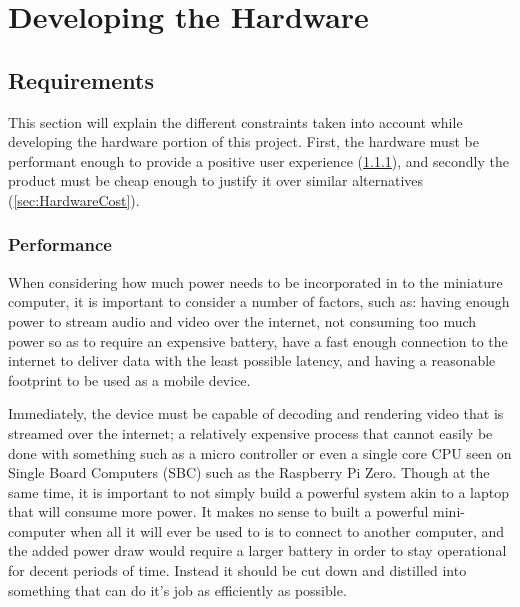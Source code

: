 \chapter{Developing the Hardware} %

\label{Chapter4} %


\section{Requirements}\label{sec:HardwareRequirements}

This section will explain the different constraints taken into account while developing the hardware portion of this project.
First, the hardware must be performant enough to provide a positive user experience (\ref{sec:HardwarePerformance}), and secondly the product must be cheap enough to justify it over similar alternatives (\ref{sec:HardwareCost}).

\subsection{Performance}\label{sec:HardwarePerformance}

When considering how much power needs to be incorporated in to the miniature computer, it is important to consider a number of factors, such as: having enough power to stream audio and video over the internet, not consuming too much power so as to require an expensive battery, have a fast enough connection to the internet to deliver data with the least possible latency, and having a reasonable footprint to be used as a mobile device.

Immediately, the device must be capable of decoding and rendering video that is streamed over the internet; a relatively expensive process that cannot easily be done with something such as a micro controller or even a single core CPU seen on Single Board Computers (SBC) such as the Raspberry Pi Zero.
Though at the same time, it is important to not simply build a powerful system akin to a laptop that will consume more power.
It makes no sense to built a powerful mini-computer when all it will ever be used to is to connect to another computer, and the added power draw would require a larger battery in order to stay operational for decent periods of time.
Instead it should be cut down and distilled into something that can do it's job as efficiently as possible.

